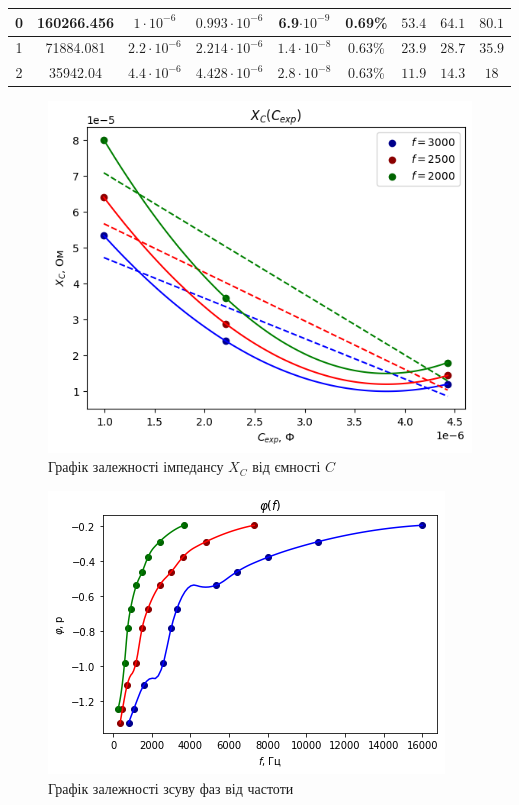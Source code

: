 \documentclass[a4paper,12pt]{article}
\begin{document}
\begin{justify}
\begin{table}[htp]
\begin{adjustwidth}{-0.9cm}{}
\begin{tabular}{|c|c|c|c|c|c|c|c|c|}
0 & 160266.456 & $1\cdot10^{-6}$   & $0.993\cdot10^{-6}$ & 6.9$\cdot10^{-9}$ & 0.69\%          & $53.4$ & $64.1$ & $80.1$ \\ \hline
1 & 71884.081   & $2.2\cdot10^{-6}$ & $2.214\cdot10^{-6}$ & $1.4\cdot10^{-8}$ & 0.63\%          & $23.9$ & $28.7$ & $35.9$ \\ \hline
2 & 35942.04  & $4.4\cdot10^{-6}$ & $4.428\cdot10^{-6}$ & $2.8\cdot10^{-8}$ & 0.63\%          & $11.9$ & $14.3$ & $18$  \\ \hline
\end{tabular}
\end{adjustwidth}
\end{table}
	\begin{figure}[h!]
		\begin{center}
			\includegraphics[scale=0.8]{media/graph14a}
		\end{center}
		\caption{Графік залежності імпедансу $X_C$ від ємності $C$}
		\label{Picture_2}
	\end{figure}\newpage
   
\begin{figure}[h!]
		\begin{center}
			\includegraphics[scale=0.8]{media/graph15a}
		\end{center}
		\caption{Графік залежності зсуву фаз від частоти}
		\label{Picture_е}
	\end{figure}
	

\end{justify}
\end{document}
